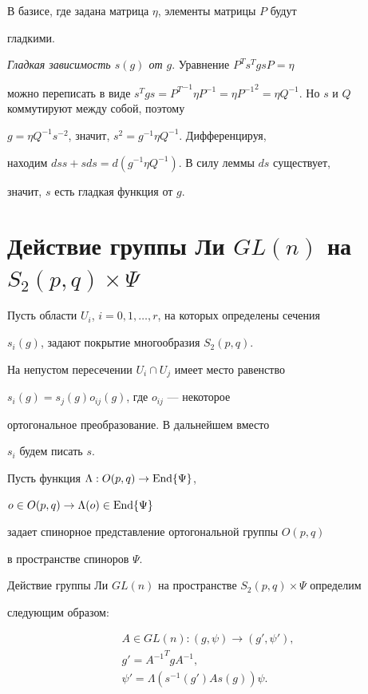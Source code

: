 В базисе, где задана матрица $\eta$, элементы матрицы $P$ будут 


гладкими.





{\it Гладкая зависимость $s(g)$ от $g$}. Уравнение $P^Ts^TgsP= \eta$ 


можно переписать в виде $s^Tgs={P^T}^{-1}\eta P^{-1}=\eta{P^{-1}}^2=


\eta Q^{-1}$. Но $s$ и $Q$ коммутируют между собой, поэтому


$g=\eta Q^{-1}s^{-2}$, значит, $s^2=g^{-1}\eta Q^{-1}$. Дифференцируя, 


находим $ds s+sds=d(g^{-1}\eta Q^{-1})$. В силу леммы $ds$ существует, 


значит, $s$ есть гладкая функция от $g$.





\section{Действие группы Ли $GL(n)$ на $S_2(p,q)\times \Psi$}





Пусть области $U_i$, $i=0,1,\dotsc,r$, на которых определены сечения


$s_i(g)$, задают покрытие многообразия $S_2(p,q)$.


На непустом пересечении $U_i\cap U_j$ имеет место равенство


$s_i(g)=s_j(g)o_{ij}(g)$, где $o_{ij}$ --- некоторое


ортогональное преобразование. В дальнейшем вместо


$s_i$ будем писать $s$.





Пусть функция $\Lambda: O(p,q)\to \operatorname{End}\{\Psi\}$,


$o\in O(p,q)\to \Lambda(o)\in \operatorname{End}\{\Psi\}$


задает спинорное представление ортогональной группы $O(p,q)$


в пространстве спиноров $\Psi$.


Действие группы Ли $GL(n)$ на пространстве $S_2(p,q)\times \Psi$ определим


следующим образом:


\begin{gather*}


A\in GL(n): (g,\psi) \to (g',\psi'), \\


g'={A^{-1}}^TgA^{-1}, \\


\psi'=\Lambda(s^{-1}(g')As(g))\psi.


\end{gather*}


